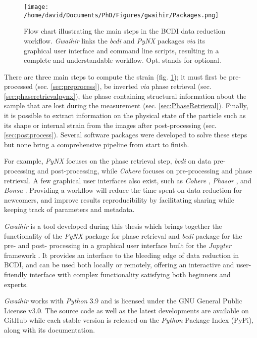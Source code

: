 \begin{figure}[!htb]
    \texttt{[image: /home/david/Documents/PhD/Figures/gwaihir/Packages.png]}
    \caption{
    Flow chart illustrating the main steps in the BCDI data reduction workflow.
    \textit{Gwaihir} links the \textit{bcdi} and \textit{PyNX} packages \textit{via} its graphical user interface and command line scripts, resulting in a complete and understandable workflow.
    Opt. stands for optional.
    }
    \label{fig:Packages}
\end{figure}

There are three main steps to compute the strain (fig. \ref{fig:Packages}); it must first be pre-processed (sec. \ref{sec:preprocess}), be inverted \textit{via} phase retrieval (sec. \ref{sec:phaseretrievalpynx}), the phase containing structural information about the sample that are lost during the measurement (sec. \ref{sec:PhaseRetrieval}).
Finally, it is possible to extract information on the physical state of the particle such as its shape or internal strain from the images after post-processing (sec. \ref{sec:postprocess}).
Several software packages were developed to solve these steps but none bring a comprehensive pipeline from start to finish.

For example, \textit{PyNX} \parencite{pynx2011} focuses on the phase retrieval step, \textit{bcdi} \parencite{jerome_carnis_2021_5741935} on data pre-processing and post-processing, while \textit{Cohere} \parencite{cohere_2021} focuses on pre-processing and phase retrieval.
A few graphical user interfaces also exist, such as \textit{Cohere} \parencite{cohere_2021}, \textit{Phasor} \parencite{dzhigaev_dzhigaevdphasor_2021}, and \textit{Bonsu} \parencite{newton_bonsu_2012}.
Providing a workflow will reduce the time spent on data reduction for newcomers, and improve results reproducibility by facilitating sharing while keeping track of parameters and metadata.

\textit{Gwaihir} is a tool developed during this thesis which brings together the functionality of the \textit{PyNX} package for phase retrieval and \textit{bcdi} package for the pre- and post- processing in a graphical user interface built for the \textit{Jupyter} framework \parencite{Kluyver2016jupyter}.
It provides an interface to the bleeding edge of data reduction in BCDI, and can be used both locally or remotely, offering an interactive and user-friendly interface with complex functionality satisfying both beginners and experts.

\textit{Gwaihir} works with \textit{Python} 3.9 and is licensed under the GNU General Public License v3.0.
The source code as well as the latest developments are available on GitHub while each stable version is released on the \textit{Python} Package Index (PyPi), along with its documentation.

